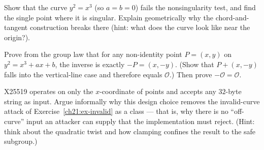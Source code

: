 \begin{exercise}
\label{ch21:ex-singular}
Show that the curve $y^2 = x^3$ (so $a=b=0$) fails the nonsingularity test, and find the
single point where it is singular. Explain geometrically why the chord-and-tangent
construction breaks there (hint: what does the curve look like near the origin?).
\end{exercise}

\begin{exercise}
\label{ch21:ex-inverse}
Prove from the group law that for any non-identity point $P=(x,y)$ on
$y^2 = x^3+ax+b$, the inverse is exactly $-P = (x,-y)$. (Show that $P + (x,-y)$ falls
into the vertical-line case and therefore equals $\mathcal{O}$.) Then prove $-\mathcal{O}
= \mathcal{O}$.
\end{exercise}

\begin{exercise}
\label{ch21:ex-x25519}
X25519 operates on only the $x$-coordinate of points and accepts any $32$-byte string as
input. Argue informally why this design choice removes the invalid-curve attack of
Exercise~\ref{ch21:ex-invalid} as a class --- that is, why there is no ``off-curve''
input an attacker can supply that the implementation must reject. (Hint: think about the
quadratic twist and how clamping confines the result to the safe subgroup.)
\end{exercise}
